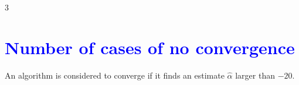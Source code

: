 \documentclass[a0,portrait]{a0poster}
\begin{document}
\begin{parcolumns}[colwidths={1=.3\textwidth,2=.39\textwidth},rulebetweencolor=blue
	,rulebetween=true]{3}
{\begin{minipage}[t]{\linewidth}

\section*{\textcolor{blue}{Number of cases of no convergence}}
An algorithm is considered to converge if it finds an estimate $\widehat{\alpha}$ larger than $-20$.


\end{minipage}}
\end{parcolumns}
\end{document}
